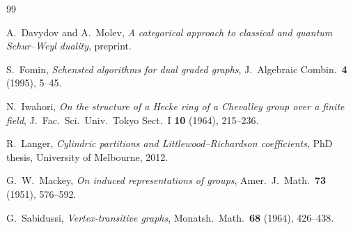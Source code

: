 \documentclass[12pt,a4paper]{article}
\theoremstyle{definition}
\theoremstyle{remark}
\begin{document}
\begin{thebibliography}{99}

A.~Davydov and A.~Molev,
\emph{A categorical approach to classical and quantum Schur--Weyl
duality},
preprint.

S.~Fomin,
\emph{Schensted algorithms for dual graded graphs},
J.~Algebraic Combin.\ \textbf{4} (1995), 5--45.

N.~Iwahori,
\emph{On the structure of a Hecke ring of a Chevalley group over a
finite field},
J.~Fac.\ Sci.\ Univ.\ Tokyo Sect.\ I \textbf{10} (1964), 215--236.

R.~Langer,
\emph{Cylindric partitions and Littlewood--Richardson coefficients},
PhD thesis, University of Melbourne, 2012.

G.~W.~Mackey,
\emph{On induced representations of groups},
Amer.\ J.\ Math.\ \textbf{73} (1951), 576--592.

G.~Sabidussi,
\emph{Vertex-transitive graphs},
Monatsh.\ Math.\ \textbf{68} (1964), 426--438.

\end{thebibliography}
\end{document}
